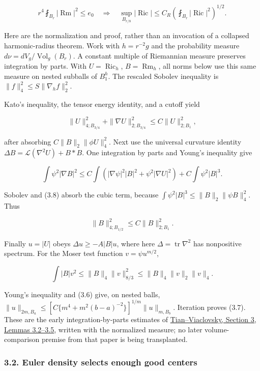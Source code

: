 \documentclass[
  10pt,
]{article}
\begin{document}
\[
 r^4\fint_{B_r}|\operatorname{Rm}|^2\le e_0
 \quad\Longrightarrow\quad
 \sup_{B_{r/8}}|\operatorname{Ric}|
                  \le C_R\left(\fint_{B_r}|\operatorname{Ric}|^2\right)^{1/2}.
                                                        \tag{3.7}
\]

Here are the normalization and proof, rather than an invocation of a
collapsed harmonic-radius theorem. Work with \(h=r^{-2}g\) and the
probability measure \(d\nu=dV_g/\operatorname{Vol}_g(B_r)\). A constant
multiple of Riemannian measure preserves integration by parts. With
\(U=\operatorname{Ric}_h\), \(B=\operatorname{Rm}_h\), all norms below
use this same measure on nested subballs of \(B_1^h\). The rescaled
Sobolev inequality is \(\|f\|_4^2\le S\|\nabla_hf\|_2^2\).

Kato's inequality, the tensor energy identity, and a cutoff yield

\[
 \|U\|_{4;B_{3/4}}^2+\|\nabla U\|_{2;B_{3/4}}^2
                              \le C\|U\|_{2;B_1}^2,             \tag{3.8}
\]

after absorbing \(C\|B\|_2\|\phi U\|_4^2\). Next use the universal
curvature identity \(\Delta B=\mathcal L(\nabla^2U)+B*B\). One
integration by parts and Young's inequality give

\[
 \int\psi^2|\nabla B|^2\le
 C\int(|\nabla\psi|^2|B|^2+\psi^2|\nabla U|^2)
                                      +C\int\psi^2|B|^3.
\]

Sobolev and (3.8) absorb the cubic term, because
\(\int\psi^2|B|^3\le\|B\|_2\|\psi B\|_4^2\). Thus

\[
                         \|B\|_{4;B_{1/2}}^2\le C\|B\|_{2;B_1}^2.
                                                        \tag{3.9}
\]

Finally \(u=|U|\) obeys \(\Delta u\ge-A|B|u\), where here
\(\Delta=\operatorname{tr}\nabla^2\) has nonpositive spectrum. For the
Moser test function \(v=\psi u^{m/2}\),

\[
 \int|B|v^2\le\|B\|_4\|v\|_{8/3}^2
                   \le\|B\|_4\|v\|_2\|v\|_4.
\]

Young's inequality and (3.6) give, on nested balls,
\(\|u\|_{2m,B_a}\le[C\{m^4+m^2(b-a)^{-2}\}]^{1/m} \|u\|_{m,B_b}\).
Iteration proves (3.7). These are the early integration-by-parts
estimates of \href{https://arxiv.org/pdf/math/0310302}{Tian--Viaclovsky,
Section 3, Lemmas 3.2--3.5}, written with the normalized measure; no
later volume-comparison premise from that paper is being transplanted.

\hypertarget{euler-density-selects-enough-good-centers}{%
\subsubsection{3.2. Euler density selects enough good
centers}\label{euler-density-selects-enough-good-centers}}
\end{document}
